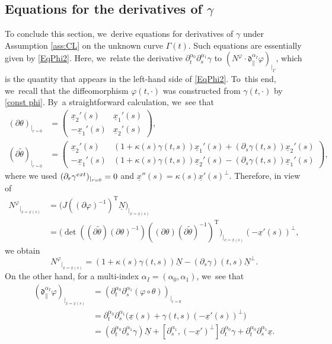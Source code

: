 \documentclass[11pt]{article}
\newcommand{\dpar}{{\mathfrak d}_{\parallel}}
\newcommand{\dt}{\partial_t}
\newcommand{\ul}[1]{\underline{#1}}
\newcommand{\itGamma}{\mathit{\Gamma}}
\theoremstyle{definition}
\begin{document}
\subsection{Equations for the derivatives of $\gamma$}\label{subsect:Eqg}
To conclude this section, we~derive equations for derivatives of $\gamma$ under Assumption \ref{ass:CL} on the unknown curve $\itGamma(t)$.
Such equations are essentially given by \eqref{EqPhi2}.
Here, we~relate the derivative $\dt^{\alpha_0}\partial_s^{\alpha_1}\gamma$ to $(N^\varphi\cdot\dpar^{\alpha_I}\varphi)_{\vert_{\ul{\itGamma}}}$,
which is the quantity that appears in the left-hand side of \eqref{EqPhi2}.
To~this end, we~recall that the diffeomorphism $\varphi(t,\cdot)$ was constructed from $\gamma(t,\cdot)$ by \eqref{const phi}. By~a straightforward calculation, we~see that
\begin{align*}
(\partial\theta)_{\vert_{r=0}} &=
\begin{pmatrix}
\ul{x}_2'(s) & \ul{x}_1'(s) \\
-\ul{x}_1'(s) & \ul{x}_2'(s)
\end{pmatrix}, \\
(\partial\tilde{\theta})_{\vert_{r=0}} &=
\begin{pmatrix}
\ul{x}_2'(s) & (1+\kappa(s)\gamma(t,s))\ul{x}_1'(s) + (\partial_s\gamma(t,s))\ul{x}_2'(s) \\
-\ul{x}_1'(s) & (1+\kappa(s)\gamma(t,s))\ul{x}_2'(s) - (\partial_s\gamma(t,s))\ul{x}_1'(s)
\end{pmatrix},
\end{align*}
where we used $(\partial_r\gamma^{\rm ext})_{\vert_{r=0}} = 0$ and $\ul{x}''(s) = \kappa(s)\ul{x}'(s)^\perp$.
Therefore, in view of
\begin{align*}
{N^\varphi}_{\vert_{x=\ul{x}(s)}}
&= \bigl(J((\partial\varphi)^{-1})^\mathrm{T}\ul{N}\bigr)_{\vert_{x=\ul{x}(s)}}\\
&= \bigl(\det((\partial\widetilde{\theta})(\partial\theta)^{-1}) ((\partial\theta)(\partial\widetilde{\theta})^{-1})^\mathrm{T}\bigr)_{\vert_{x=\ul{x}(s)}}
(-\ul{x}'(s))^\perp,
\end{align*}
we obtain
\begin{equation}\label{Nphi2}
{N^\varphi}_{\vert_{x=\ul{x}(s)}}
= (1+\kappa(s)\gamma(t,s))\ul{N} - (\partial_s\gamma)(t,s)\ul{N}^\perp.
\end{equation}
On the other hand, for a multi-index $\alpha_I=(\alpha_0,\alpha_1)$, we~see that
\begin{align*}
(\dpar^{\alpha_I}\varphi)_{\vert_{x=\ul{x}(s)}}
&= (\dt^{\alpha_0}\partial_s^{\alpha_1}(\varphi\circ\theta))_{\vert_{r=0}} \\
&= \dt^{\alpha_0}\partial_s^{\alpha_1}\bigl(\ul{x}(s)+\gamma(t,s)(-\ul{x}'(s))^\perp \bigr) \\
&= (\dt^{\alpha_0}\partial_s^{\alpha_1}\gamma)\ul{N}
+ [\partial_s^{\alpha_1},(-\ul{x}')^\perp]\dt^{\alpha_0}\gamma + \dt^{\alpha_0}\partial_s^{\alpha_1}\ul{x}.
\end{align*}
\end{document}
